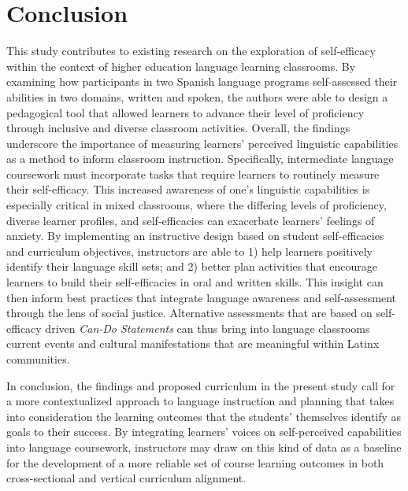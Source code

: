 \documentclass[output=paper]{langscibook}
\begin{document}
\section{{Conclusion}}

\begin{sloppypar}
This study contributes to existing research on the exploration of self-efficacy within the context of higher education language learning classrooms. By examining how participants in two Spanish language programs self-assessed their abilities in two domains, written and spoken, the authors were able to design a pedagogical tool that allowed learners to advance their level of proficiency through inclusive and diverse classroom activities. Overall, the findings underscore the importance of measuring learners’ perceived linguistic capabilities as a method to inform classroom instruction. Specifically, intermediate language coursework must incorporate tasks that require learners to routinely measure their self-efficacy. This increased awareness of one’s linguistic capabilities is especially critical in mixed classrooms, where the differing levels of proficiency, diverse learner profiles, and self-efficacies can exacerbate learners’ feelings of anxiety. By implementing an instructive design based on student self-efficacies and curriculum objectives, instructors are able to 1) help learners positively identify their language skill sets; and 2) better plan activities that encourage learners to build their self-efficacies in oral and written skills. This insight can then inform best practices that integrate language awareness and self-assessment through the lens of social justice. Alternative assessments that are based on self-efficacy driven \textit{Can-Do Statements} can thus bring into language classrooms current events and cultural manifestations that are meaningful within Latinx communities.
\end{sloppypar}

In conclusion, the findings and proposed curriculum in the present study call for a more contextualized approach to language instruction and planning that takes into consideration the learning outcomes that the students’ themselves identify as goals to their success. By integrating learners’ voices on self-perceived capabilities into language coursework, instructors may draw on this kind of data as a baseline for the development of a more reliable set of course learning outcomes in both cross-sectional and vertical curriculum alignment.

\sloppy
\printbibliography[heading=subbibliography,notkeyword=this]
\end{document}
